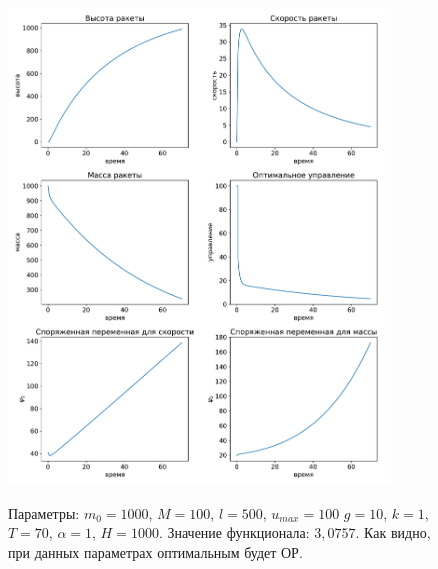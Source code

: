 \documentclass[12pt, a4paper]{article} %
\begin{document}
\begin{figure}[H]
\begin{center}
    \includegraphics[width=0.9\textwidth]{2_1.pdf}
    \label{fig:1_5}
    \caption{Параметры: $m_0=1000$, $M=100$,  $l=500$,  $u_{max}=100$
        $g=10$,  $k=1$,  $T=70$, $\alpha=1$,  $H=1000$.
        Значение функционала: $3{,}0757$.
        Как видно, при данных параметрах оптимальным будет ОР.}
\end{center} 
\end{figure}
\end{document}
